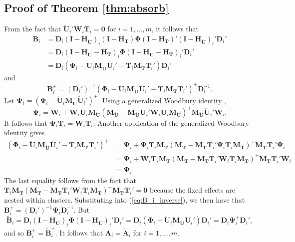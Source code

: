 \documentclass[draft]{ectaart}\usepackage[]{graphicx}\usepackage[]{color}
\newcommand{\bm}{\mathbf}
\newcommand{\bs}{\boldsymbol}
\begin{document}
\subsection{Proof of Theorem \ref{thm:absorb}}

From the fact that $\bm{\ddot{U}}_i'\bm{W}_i\bm{T}_i = \bm{0}$ for $i = 1,...,m$, it follows that \begin{align*}
\bm{B}_i &= \bm{D}_i \left(\bm{I} - \bm{H_{\ddot{U}}}\right)_i \left(\bm{I} - \bm{H_T}\right) \bs\Phi \left(\bm{I} - \bm{H_T}\right)' \left(\bm{I} - \bm{H_{\ddot{U}}}\right)_i' \bm{D}_i'\\
&= \bm{D}_i \left(\bm{I} - \bm{H_{\ddot{U}}} - \bm{H_T}\right)_i \bs\Phi \left(\bm{I} - \bm{H_{\ddot{U}}} - \bm{H_T}\right)_i' \bm{D}_i' \\
&= \bm{D}_i \left(\bs\Phi_i - \bm{\ddot{U}}_i \bm{M_{\ddot{U}}}\bm{\ddot{U}}_i' - \bm{T}_i \bm{M_T}\bm{T}_i'\right)\bm{D}_i'
\end{align*}
and 
\begin{equation}
\label{eq:B_i_inverse}
\bm{B}_i^+ = \left(\bm{D}_i'\right)^{-1} \left(\bs\Phi_i - \bm{\ddot{U}}_i \bm{M_{\ddot{U}}}\bm{\ddot{U}}_i' - \bm{T}_i \bm{M_T}\bm{T}_i'\right)^+ \bm{D}_i^{-1}.
\end{equation}
Let $\bs\Psi_i = \left(\bs\Phi_i - \bm{\ddot{U}}_i \bm{M_{\ddot{U}}}\bm{\ddot{U}}_i'\right)^+$.
Using a generalized Woodbury identity \citep{Henderson1981on}, \[
\bs\Psi_i = \bm{W}_i + \bm{W}_i \bm{\ddot{U}}_i \bm{M_{\ddot{U}}}\left(\bm{M_{\ddot{U}}} - \bm{M_{\ddot{U}}} \bm{\ddot{U}}_i' \bm{W}_i \bm{\ddot{U}}_i \bm{M_{\ddot{U}}}\right)^+ \bm{M_{\ddot{U}}}\bm{\ddot{U}}_i'\bm{W}_i. \]
It follows that $\bs\Psi_i \bm{T}_i = \bm{W}_i \bm{T}_i$. 
Another application of the generalized Woodbury identity gives 
\begin{align*}
\left(\bs\Phi_i - \bm{\ddot{U}}_i \bm{M_{\ddot{U}}}\bm{\ddot{U}}_i' - \bm{T}_i \bm{M_T}\bm{T}_i'\right)^+ &= \bs\Psi_i + \bs\Psi_i \bm{T}_i \bm{M_T}\left(\bm{M_T} - \bm{M_T}\bm{T}_i' \bs\Psi_i \bm{T}_i \bm{M_T}\right)^+ \bm{M_T} \bm{T}_i' \bs\Psi_i \\
&= \bs\Psi_i + \bm{W}_i \bm{T}_i \bm{M_T}\left(\bm{M_T} - \bm{M_T}\bm{T}_i' \bm{W}_i \bm{T}_i\bm{M_T}\right)^+ \bm{M_T} \bm{T}_i' \bm{W}_i \\
&= \bs\Psi_i.
\end{align*}
The last equality follows from the fact that $\bm{T}_i \bm{M_T}\left(\bm{M_T} - \bm{M_T}\bm{T}_i' \bm{W}_i \bm{T}_i\bm{M_T}\right)^{-} \bm{M_T} \bm{T}_i' = \bm{0}$ because the fixed effects are nested within clusters. 
Substituting into (\ref{eq:B_i_inverse}), we then have that $\bm{B}_i^+ = \left(\bm{D}_i'\right)^{-1} \bs\Psi_i \bm{D}_i^{-1}$. 
But \[
\bm{\tilde{B}}_i = \bm{D}_i \left(\bm{I} - \bm{H_{\ddot{U}}}\right)_i \bs\Phi \left(\bm{I} - \bm{H_{\ddot{U}}}\right)_i' \bm{D}_i' = \bm{D}_i \left(\bs\Phi_i - \bm{\ddot{U}}_i\bm{M_{\ddot{U}}} \bm{\ddot{U}}_i'\right) \bm{D}_i' = \bm{D}_i \bs\Psi_i^+ \bm{D}_i',
\]
and so $\bm{B}_i^+ = \bm{\tilde{B}}_i^+$. It follows that $\bm{A}_i = \bm{\tilde{A}}_i$ for $i = 1,...,m$. 
\end{document}
